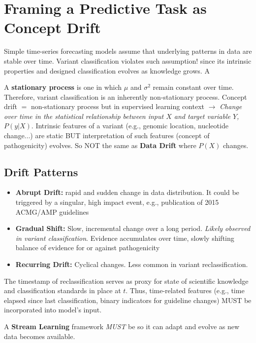 \documentclass[../main.tex]{subfiles}
\begin{document}
\section{Framing a Predictive Task as Concept Drift}
Simple time-series forecasting models assume that underlying patterns in data are stable over time. Variant classification violates such assumption! since its intrinsic properties  and designed classification evolves as knowledge grows. A

A \textbf{stationary process} is one in which $\mu$ and $\sigma^2$ remain constant over time. Therefore, variant classification is an inherently non-stationary process. Concept drift $=$ non-stationary process but in supervised learning context $\rightarrow$ \textit{Change over time in the statistical relationship between input $X$ and target variable $Y$, $P(y|X)$}. Intrinsic features of a variant (e.g., genomic location, nucleotide change...) are static BUT interpretation of such features (concept of pathogenicity) evolves. So NOT the same as \textbf{Data Drift} where $P(X)$ changes.

\subsection{Drift Patterns}
\begin{itemize}
    \item \textbf{Abrupt Drift:} rapid and sudden change in data distribution. It could be triggered by a singular, high impact event, e.g., publication of 2015 ACMG/AMP guidelines
    \item \textbf{Gradual Shift:} Slow, incremental change over a long period. \textit{Likely observed in variant classification}. Evidence accumulates over time, slowly shifting balance of evidence for or against pathogenicity
    \item \textbf{Recurring Drift:} Cyclical changes. Less common in variant reclassification.
\end{itemize}

The timestamp of reclassification serves as proxy for state of scientific knowledge and classification standards in place at $t$. Thus, time-related features (e.g., time elapsed since last classification, binary indicators for guideline changes) MUST be incorporated into model's input.

A \textbf{Stream Learning} framework \textit{MUST} be so it can adapt and evolve as new data becomes available.
\end{document}
